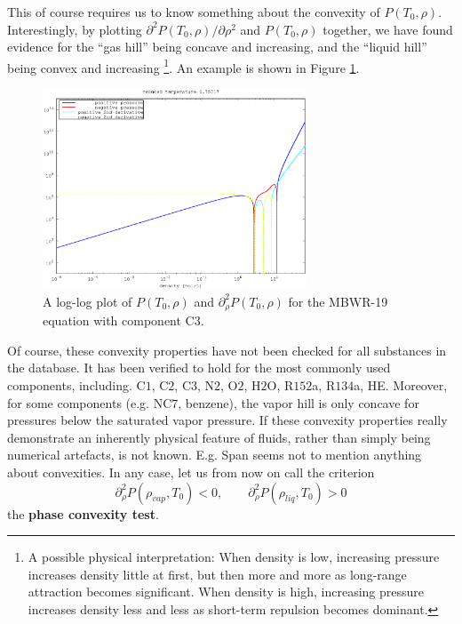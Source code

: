 \documentclass[english]{../thermomemo/thermomemo}
\numberwithin{equation}{section}
\begin{document}
This of course requires us to know something about the convexity of $P(T_0,\rho)$. Interestingly, by plotting
$\partial^2P(T_0,\rho)/\partial\rho^2$ and $P(T_0,\rho)$ together, we have found evidence
for the ``gas hill'' being concave and increasing, and the ``liquid
hill'' being convex and increasing%
\footnote{A possible physical interpretation: When density is
  low, increasing pressure increases density little at first, but then
  more and more as long-range attraction becomes significant. When
  density is high, increasing pressure increases density less and less
  as short-term repulsion becomes dominant.}. %
An example is shown in Figure \ref{convexityPlot}.
\begin{figure}[h]
  \centering
  \includegraphics[width=0.7\textwidth]{figures/convexity.eps}
  \caption{A log-log plot of $P(T_0,\rho)$ and $\partial_\rho^2P(T_0,\rho)$ for the MBWR-19 equation with component C$3$.}
  \label{convexityPlot}
\end{figure}
Of course, these convexity properties have not been checked for all
substances in the database. It has been verified to hold for the most
commonly used components, including. C$1$, C$2$, C$3$, N$2$, O$2$,
H$2$O, R$152$a, R$134$a, HE. Moreover, for some components
(e.g. NC$7$, benzene), the vapor hill is only concave for pressures
below the saturated vapor pressure. If these convexity properties
really demonstrate an inherently physical feature of fluids, rather
than simply being numerical artefacts, is not known. E.g. Span
\cite{Span03} seems not to mention anything about convexities. In any
case, let us from now on call the criterion
\begin{equation}
  \partial_\rho^2 P(\rho_{vap},T_0) < 0, \qquad \partial_\rho^2 P(\rho_{liq},T_0) > 0
\end{equation}
the \textbf{phase convexity test}.
\end{document}
